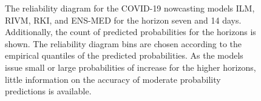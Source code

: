 \documentclass[pdflatex]{sn-jnl}
\theoremstyle{plain}%
\theoremstyle{definition}
\begin{document}
\begin{figure}
\begin{subfigure}{\textwidth}
    \end{subfigure}
    \caption[Reliability diagrams for COVID-19 nowcasting models and the horizon seven and 14 days.]{The reliability diagram for the COVID-19 nowcasting models ILM, RIVM, RKI, and ENS-MED for the horizon seven and 14 days.
    Additionally, the count of predicted probabilities for the horizons is shown.
        The reliability diagram bins are chosen according to the empirical quantiles of the predicted probabilities.
    As the models issue small or large probabilities of increase for the higher horizons, little information on the accuracy of moderate probability predictions is available.}
    \label{fig:app-covid-rel}
\end{figure}
\end{document}
